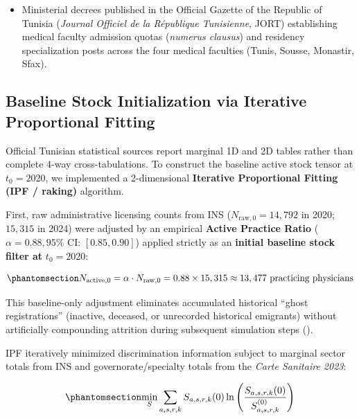 \documentclass[
  11pt,
  a4paper]{article}
\providecommand{\tightlist}{%
  \setlength{\itemsep}{0pt}\setlength{\parskip}{0pt}}
\begin{document}
\begin{enumerate}
  \begin{itemize}
  \tightlist
  \item
    Ministerial decrees published in the Official Gazette of the
    Republic of Tunisia (\emph{Journal Officiel de la République
    Tunisienne}, JORT) establishing medical faculty admission quotas
    (\emph{numerus clausus}) and residency specialization posts across
    the four medical faculties (Tunis, Sousse, Monastir, Sfax).
  \end{itemize}
\end{enumerate}

\subsection{Baseline Stock Initialization via Iterative Proportional
Fitting}\label{sec-methods-ipf}

Official Tunisian statistical sources report marginal 1D and 2D tables
rather than complete 4-way cross-tabulations. To construct the baseline
active stock tensor at \(t_0 = 2020\), we implemented a 2-dimensional
\textbf{Iterative Proportional Fitting (IPF / raking)} algorithm.

First, raw administrative licensing counts from INS
(\(N_{\text{raw}, 0} = 14,792\) in 2020; \(15,315\) in 2024) were
adjusted by an empirical \textbf{Active Practice Ratio}
(\(\alpha = 0.88, 95\%\text{ CI: } [0.85, 0.90]\)) applied strictly as
an \textbf{initial baseline stock filter at} \(t_0 = 2020\):

\begin{equation}\protect\phantomsection\label{eq-active-ratio}{N_{\text{active}, 0} = \alpha \cdot N_{\text{raw}, 0} = 0.88 \times 15,315 \approx 13,477 \text{ practicing physicians}}\end{equation}

This baseline-only adjustment eliminates accumulated historical ``ghost
registrations'' (inactive, deceased, or unrecorded historical emigrants)
without artificially compounding attrition during subsequent simulation
steps ().

IPF iteratively minimized discrimination information subject to marginal
sector totals from INS and governorate/specialty totals from the
\emph{Carte Sanitaire 2023}:

\begin{equation}\protect\phantomsection\label{eq-ipf-obj}{\min_{S} \sum_{a,s,r,k} S_{a,s,r,k}(0) \ln\left( \frac{S_{a,s,r,k}(0)}{S_{a,s,r,k}^{(0)}} \right)}\end{equation}
\end{document}
